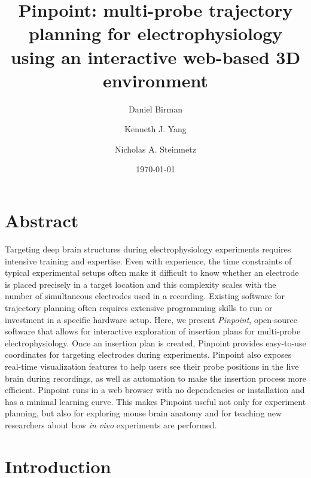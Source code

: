 \documentclass{article}
\title{Pinpoint: multi-probe trajectory planning for electrophysiology using an interactive web-based 3D environment}
\author[1,3,*]{Daniel Birman}
\author[1]{Kenneth J. Yang}
\author[1,3]{Nicholas A. Steinmetz}
\affil[1]{Department of Biological Structure, University of Washington, Seattle, WA 98195, USA}
\affil[3]{International Brain Laboratory, ?, ?, ?}
\affil[*]{Corresponding author: dbirman@uw.edu}
\date{\today}
\begin{document}
\maketitle

\section{Abstract}
Targeting deep brain structures during electrophysiology experiments requires intensive training and expertise. Even with experience, the time constraints of typical experimental setups often make it difficult to know whether an electrode is placed precisely in a target location and this complexity scales with the number of simultaneous electrodes used in a recording. Existing software for trajectory planning often requires extensive programming skills to run or investment in a specific hardware setup. Here, we present \textit{Pinpoint}, open-source software that allows for interactive exploration of insertion plans for multi-probe electrophysiology. Once an insertion plan is created, Pinpoint provides easy-to-use coordinates for targeting electrodes during experiments. Pinpoint also exposes real-time visualization features to help users see their probe positions in the live brain during recordings, as well as automation to make the insertion process more efficient. Pinpoint runs in a web browser with no dependencies or installation and has a minimal learning curve. This makes Pinpoint useful not only for experiment planning, but also for exploring mouse brain anatomy and for teaching new researchers about how \textit{in vivo} experiments are performed. 

\clearpage

\linenumbers

\section{Introduction}

\end{document}
